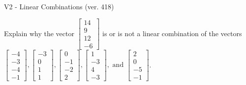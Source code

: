 \begin{exercise}
  \begin{exerciseTitle}V2 - Linear Combinations (ver. 418)\end{exerciseTitle}
  \begin{exerciseStatement}
    Explain why the vector \(\left[\begin{array}{c}
14 \\
9 \\
12 \\
-6
\end{array}\right]\)  is or is not a linear 
	combination of the vectors \(\left[\begin{array}{c}
-4 \\
-3 \\
-4 \\
-1
\end{array}\right] , \left[\begin{array}{c}
-3 \\
0 \\
1 \\
1
\end{array}\right] , \left[\begin{array}{c}
0 \\
-1 \\
-2 \\
2
\end{array}\right] , \left[\begin{array}{c}
1 \\
-3 \\
4 \\
-3
\end{array}\right] , \text{ and } \left[\begin{array}{c}
2 \\
0 \\
-5 \\
-1
\end{array}\right]\).
	



\end{exerciseStatement}
\end{exercise}
